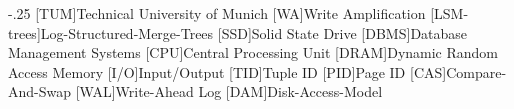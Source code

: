 \documentclass[headsepline,footsepline,footinclude=false,oneside,fontsize=11pt,paper=a4,listof=totoc,bibliography=totoc]{scrbook} %
\begin{document}


\frontmatter{}





\tableofcontents{}

\mainmatter{}










% 


\begin{acronym}
	\itemsep-.25\baselineskip
	[TUM]{Technical University of Munich}
	[WA]{Write Amplification}
	[LSM-trees]{Log-Structured-Merge-Trees}
	[SSD]{Solid State Drive}
	[DBMS]{Database Management Systems}
	[CPU]{Central Processing Unit}
	[DRAM]{Dynamic Random Access Memory}
	[I/O]{Input/Output}
	[TID]{Tuple ID}
	[PID]{Page ID}
	[CAS]{Compare-And-Swap}
	[WAL]{Write-Ahead Log}
	[DAM]{Disk-Access-Model}
\end{acronym}

\listoffigures{}
\listoftables{}
\printbibliography{}
\end{document}
